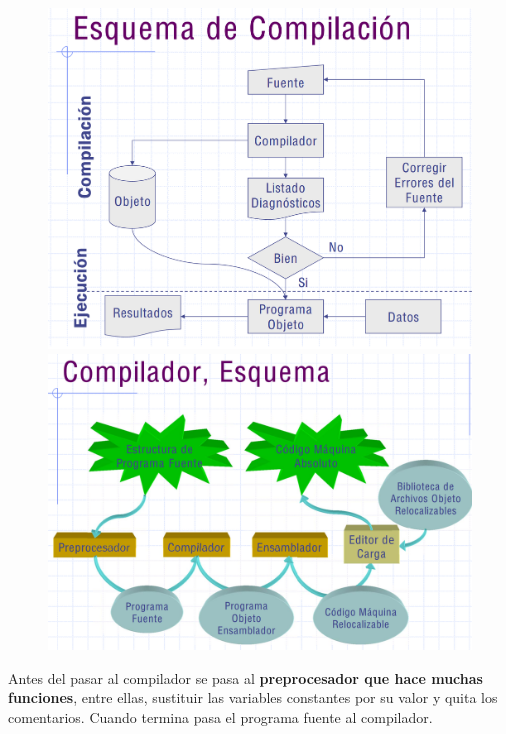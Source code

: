 \documentclass[12pt]{report} %
\begin{document}
\begin{figure}[H]
	{\includegraphics[scale=.15]{Untitled 9.png}
	\includegraphics[scale=.15]{Untitled 10.png}}
\end{figure}



Antes del pasar al compilador se pasa al \textbf{preprocesador que hace
muchas funciones}, entre ellas, sustituir las variables constantes por
su valor y quita los comentarios. Cuando termina pasa el programa fuente
al compilador.
\end{document}

